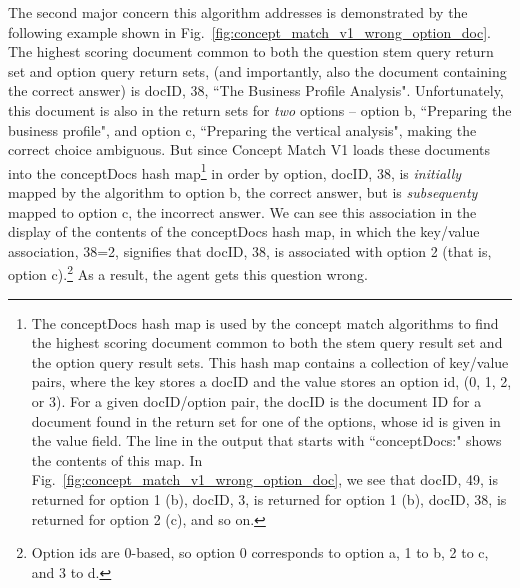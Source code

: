 The second major concern this algorithm addresses is demonstrated by the following example shown in Fig.~\ref{fig:concept_match_v1_wrong_option_doc}.  The highest scoring document common to both the question stem query return set and option query return sets, (and importantly, also the document containing the correct answer) is docID, 38, ``The Business Profile Analysis".  Unfortunately, this document is also in the return sets for \emph{two} options -- option b, ``Preparing the business profile", and option c,  ``Preparing the vertical analysis", making the correct choice ambiguous.  But since Concept Match V1 loads these documents into the conceptDocs hash map\footnote{The conceptDocs hash map is used by the concept match algorithms to find the highest scoring document common to both the stem query result set and the option query result sets.  This hash map contains a collection of key/value pairs, where the key stores a docID and the value stores an option id, (0, 1, 2, or 3).  For a given docID/option pair, the docID is the document ID for a document found in the return set for one of the options, whose id is given in the value field.  The line in the output that starts with ``conceptDocs:" shows the contents of this map.  In Fig.~\ref{fig:concept_match_v1_wrong_option_doc}, we see that docID, 49, is returned for option 1 (b), docID, 3, is returned for option 1 (b), docID, 38, is returned for option 2 (c), and so on.} in order by option, docID, 38, is \emph{initially} mapped by the algorithm to option b, the correct answer, but is \emph{subsequenty} mapped to option c, the incorrect answer.  We can see this association in the display of the contents of the conceptDocs hash map, in which the key/value association, 38=2, signifies that docID, 38, is associated with option 2 (that is, option c).\footnote{Option ids are 0-based, so option 0 corresponds to option a, 1 to b, 2 to c, and 3 to d.}  As a result, the agent gets this question wrong.

